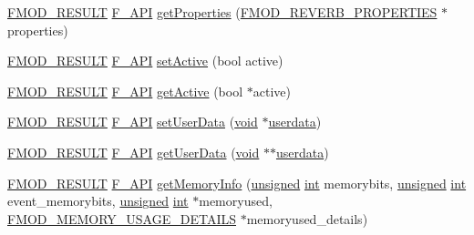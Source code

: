 \begin{DoxyCompactItemize}
\item 
\hyperlink{fmod_8h_ae6ddadf8cb315e93ae7e6456b19db276}{F\-M\-O\-D\-\_\-\-R\-E\-S\-U\-L\-T} \hyperlink{fmod_8h_ace803d13e798b0cdde4384f9f323b901}{F\-\_\-\-A\-P\-I} \hyperlink{class_f_m_o_d_1_1_reverb_a70d4d392767ba5aca142232a89fc1a5c}{get\-Properties} (\hyperlink{struct_f_m_o_d___r_e_v_e_r_b___p_r_o_p_e_r_t_i_e_s}{F\-M\-O\-D\-\_\-\-R\-E\-V\-E\-R\-B\-\_\-\-P\-R\-O\-P\-E\-R\-T\-I\-E\-S} $\ast$properties)
\item 
\hyperlink{fmod_8h_ae6ddadf8cb315e93ae7e6456b19db276}{F\-M\-O\-D\-\_\-\-R\-E\-S\-U\-L\-T} \hyperlink{fmod_8h_ace803d13e798b0cdde4384f9f323b901}{F\-\_\-\-A\-P\-I} \hyperlink{class_f_m_o_d_1_1_reverb_ace7f7f68d6f6298a356b9ee831f50aae}{set\-Active} (bool active)
\item 
\hyperlink{fmod_8h_ae6ddadf8cb315e93ae7e6456b19db276}{F\-M\-O\-D\-\_\-\-R\-E\-S\-U\-L\-T} \hyperlink{fmod_8h_ace803d13e798b0cdde4384f9f323b901}{F\-\_\-\-A\-P\-I} \hyperlink{class_f_m_o_d_1_1_reverb_a50f3bbcec09517e400fa606330738e2b}{get\-Active} (bool $\ast$active)
\item 
\hyperlink{fmod_8h_ae6ddadf8cb315e93ae7e6456b19db276}{F\-M\-O\-D\-\_\-\-R\-E\-S\-U\-L\-T} \hyperlink{fmod_8h_ace803d13e798b0cdde4384f9f323b901}{F\-\_\-\-A\-P\-I} \hyperlink{class_f_m_o_d_1_1_reverb_ad29004efcf52bf367bc13fde07527647}{set\-User\-Data} (\hyperlink{wglew_8h_aeea6e3dfae3acf232096f57d2d57f084}{void} $\ast$\hyperlink{fmod_8h_ade70958cb78f6af9bb4122305a2ceb6a}{userdata})
\item 
\hyperlink{fmod_8h_ae6ddadf8cb315e93ae7e6456b19db276}{F\-M\-O\-D\-\_\-\-R\-E\-S\-U\-L\-T} \hyperlink{fmod_8h_ace803d13e798b0cdde4384f9f323b901}{F\-\_\-\-A\-P\-I} \hyperlink{class_f_m_o_d_1_1_reverb_ac12115e79aebe3f8150c971b75de38c7}{get\-User\-Data} (\hyperlink{wglew_8h_aeea6e3dfae3acf232096f57d2d57f084}{void} $\ast$$\ast$\hyperlink{fmod_8h_ade70958cb78f6af9bb4122305a2ceb6a}{userdata})
\item 
\hyperlink{fmod_8h_ae6ddadf8cb315e93ae7e6456b19db276}{F\-M\-O\-D\-\_\-\-R\-E\-S\-U\-L\-T} \hyperlink{fmod_8h_ace803d13e798b0cdde4384f9f323b901}{F\-\_\-\-A\-P\-I} \hyperlink{class_f_m_o_d_1_1_reverb_a9be1262ba585537bdd32e569eb999d05}{get\-Memory\-Info} (\hyperlink{_free_image_8h_a425076c7067a1b5166e2cc530e914814}{unsigned} \hyperlink{wglew_8h_a500a82aecba06f4550f6849b8099ca21}{int} memorybits, \hyperlink{_free_image_8h_a425076c7067a1b5166e2cc530e914814}{unsigned} \hyperlink{wglew_8h_a500a82aecba06f4550f6849b8099ca21}{int} event\-\_\-memorybits, \hyperlink{_free_image_8h_a425076c7067a1b5166e2cc530e914814}{unsigned} \hyperlink{wglew_8h_a500a82aecba06f4550f6849b8099ca21}{int} $\ast$memoryused, \hyperlink{struct_f_m_o_d___m_e_m_o_r_y___u_s_a_g_e___d_e_t_a_i_l_s}{F\-M\-O\-D\-\_\-\-M\-E\-M\-O\-R\-Y\-\_\-\-U\-S\-A\-G\-E\-\_\-\-D\-E\-T\-A\-I\-L\-S} $\ast$memoryused\-\_\-details)
\end{DoxyCompactItemize}


